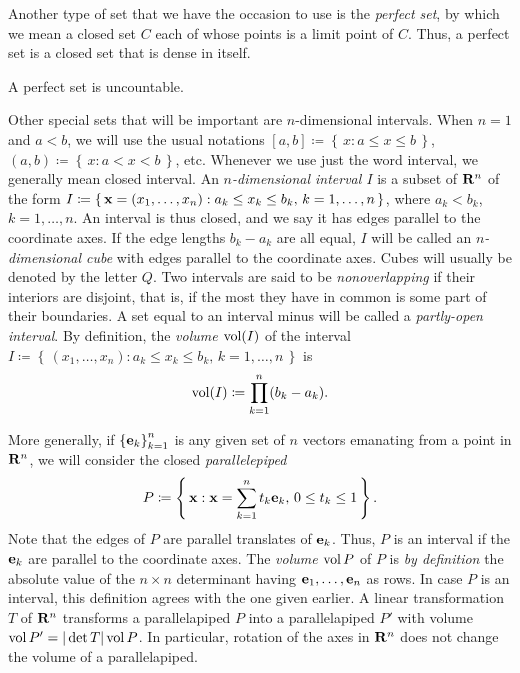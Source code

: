 Another type of set that we have the occasion to use is the \emph{perfect
  set}, by which we mean a closed set $C$ each of whose points is a limit
point of $C$. Thus, a perfect set is a closed set that is dense in itself.

\begin{theorem}[1.9]
A perfect set is uncountable.
\end{theorem}

Other special sets that will be important are $n$-dimensional
intervals. When $n=1$ and $a<b$, we will use the usual notations
$[a,b]\coloneqq\left\{\,x:a\leq x\leq b\,\right\}$,
$(a,b)\coloneqq\left\{\,x:a<x<b\,\right\}$, etc. Whenever we use just the
word interval, we generally mean closed interval. An \emph{$n$-dimensional
  interval $I$} is a subset of $\mathbf{R}^n$ of the form
$I\coloneqq\left\{\,\mathbf{x}=(x_1,\dotsc,x_n):\text{$a_k\leq x_k\leq b_k$,
    $k=1,\dotsc,n$}\,\right\}$, where $a_k<b_k$, $k=1,\dotsc,n$. An
interval is thus closed, and we say it has edges parallel to the coordinate
axes. If the edge lengths $b_k-a_k$ are all equal, $I$ will be called an
\emph{$n$-dimensional cube} with edges parallel to the coordinate
axes. Cubes will usually be denoted by the letter $Q$. Two intervals are
said to be \emph{nonoverlapping} if their interiors are disjoint, that is,
if the most they have in common is some part of their boundaries. A set
equal to an interval minus will be called a \emph{partly-open interval}. By
definition, the \emph{volume $\operatorname{vol}(I)$} of the interval
$I\coloneqq\left\{\,(x_1,\dotsc,x_n):\text{$a_k\leq x_k\leq b_k$,
    $k=1,\dotsc,n$}\,\right\}$ is
\begin{equation}
  \label{eq:volume-i}
\operatorname{vol}(I)\coloneqq\prod_{k=1}^n(b_k-a_k).
\end{equation}

More generally, if ${\{\mathbf{e}_k\}}_{k=1}^n$ is any given set of $n$ vectors
emanating from a point in $\mathbf{R}^n$, we will consider the closed
\emph{parallelepiped}
\begin{equation}
  \label{eq:parallelepiped}
P\coloneqq\left\{\,\mathbf{x}:\text{$\mathbf{x}=\sum_{k=1}^n t_k\mathbf{e}_k$, $0\leq t_k\leq
    1$}\,\right\}.
\end{equation}
Note that the edges of $P$ are parallel translates of $\mathbf{e}_k$. Thus, $P$
is an interval if the $\mathbf{e}_k$ are parallel to the coordinate axes. The
\emph{volume $\operatorname{vol} P$} of $P$ is \emph{by definition} the absolute value of
the $n\times n$ determinant having $\mathbf{e}_1,\dotsc,\mathbf{e}_n$ as rows. In case
$P$ is an interval, this definition agrees with the one given earlier. A
linear transformation $T$ of $\mathbf{R}^n$ transforms a parallelapiped $P$ into
a parallelapiped $P'$ with volume $\operatorname{vol} P'=|\det T|\operatorname{vol} P$. In particular,
rotation of the axes in $\mathbf{R}^n$ does not change the volume of a
parallelapiped.

